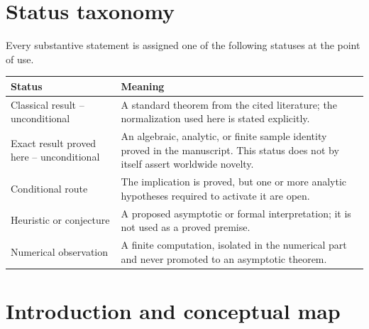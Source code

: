 \documentclass[11pt]{amsart}
\numberwithin{equation}{section}
\theoremstyle{plain}
\theoremstyle{definition}
\theoremstyle{remark}
\newcommand{\1}{\mathbf{1}}
\begin{document}
\maketitle
\tableofcontents

\bigskip

\section*{Status taxonomy}
\label{sec:status_taxonomy}

Every substantive statement is assigned one of the following statuses at the
point of use.
\begin{center}
\begin{tabular}{>{\raggedright\arraybackslash}p{}
                >{\raggedright\arraybackslash}p{}}
\toprule
Status & Meaning \\
\midrule
Classical result -- unconditional & A standard theorem from the cited
literature; the normalization used here is stated explicitly. \\
Exact result proved here -- unconditional & An algebraic, analytic, or finite
sample identity proved in the manuscript.  This status does not by itself
assert worldwide novelty. \\
Conditional route & The implication is proved, but one or more analytic
hypotheses required to activate it are open. \\
Heuristic or conjecture & A proposed asymptotic or formal interpretation; it
is not used as a proved premise. \\
Numerical observation & A finite computation, isolated in the numerical part
and never promoted to an asymptotic theorem. \\
\bottomrule
\end{tabular}
\end{center}

\section{Introduction and conceptual map}
\label{sec:introduction}
\end{document}
